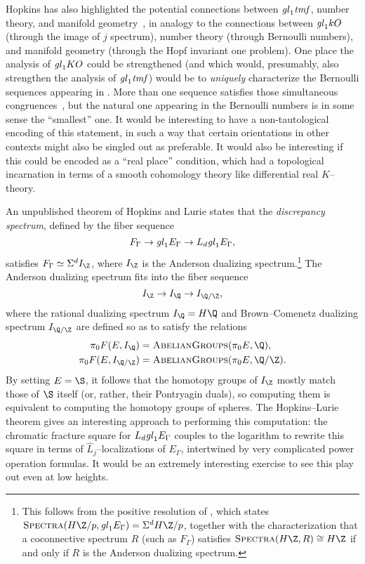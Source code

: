 Hopkins has also highlighted the potential connections between \(\mathit{gl}_1 \mathit{tmf}\), number theory, and manifold geometry~\cite{HopkinsTheStringOrientation}, in analogy to the connections between \(\mathit{gl}_1 kO\) (through the image of \(j\) spectrum), number theory (through Bernoulli numbers), and manifold geometry (through the Hopf invariant one problem).  One place the analysis of \(\mathit{gl}_1 KO\) could be strengthened (and which would, presumably, also strengthen the analysis of \(\mathit{gl}_1 \mathit{tmf}\)) would be to \emph{uniquely} characterize the Bernoulli sequences appearing in .  More than one sequence satisfies those simultaneous congruences~\cite{SprangNaumann}, but the natural one appearing in the Bernoulli numbers is in some sense the ``smallest'' one.  It would be interesting to have a non-tautological encoding of this statement, in such a way that certain orientations in other contexts might also be singled out as preferable.  It would also be interesting if this could be encoded as a ``real place'' condition, which had a topological incarnation in terms of a smooth cohomology theory like differential real \(K\)--theory.

An unpublished theorem of Hopkins and Lurie states that the \textit{discrepancy spectrum}, defined by the fiber sequence \[F_\Gamma \to \mathit{gl}_1 E_\Gamma \to L_d \mathit{gl}_1 E_\Gamma,\] satisfies \(F_\Gamma \simeq \Susp^d I_{\Z}\), where \(I_{\Z}\) is the Anderson dualizing spectrum.\footnote{This follows from the positive resolution of \cite[Conjecture 5.4.14]{HopkinsLurie}, which states \(\CatOf{Spectra}(H\Z/p, \gl_1 E_\Gamma) = \Susp^d H\Z/p\), together with the characterization that a coconnective spectrum \(R\) (such as \(F_\Gamma\)) satisfies \(\CatOf{Spectra}(H\Z, R) \cong H\Z\) if and only if \(R\) is the Anderson dualizing spectrum.}  The Anderson dualizing spectrum fits into the fiber sequence \[I_{\Z} \to I_{\Q} \to I_{\Q/\Z},\] where the rational dualizing spectrum \(I_{\Q} = H\Q\) and Brown--Comenetz dualizing spectrum \(I_{\Q/\Z}\) are defined so as to satisfy the relations
\begin{align*}
\pi_0 F(E, I_{\Q}) & = \CatOf{AbelianGroups}(\pi_0 E, \Q), \\
\pi_0 F(E, I_{\Q/\Z}) & = \CatOf{AbelianGroups}(\pi_0 E, \Q/\Z).
\end{align*}
By setting \(E = \S\), it follows that the homotopy groups of \(I_{\Z}\) mostly match those of \(\S\) itself (or, rather, their Pontryagin duals), so computing them is equivalent to computing the homotopy groups of spheres.  The Hopkins--Lurie theorem gives an interesting approach to performing this computation: the chromatic fracture square for \(L_d \mathit{gl}_1 E_\Gamma\) couples to the logarithm to rewrite this square in terms of \(\widehat L_j\)--localizations of \(E_\Gamma\), intertwined by very complicated power operation formulas.  It would be an extremely interesting exercise to see this play out even at low heights.

